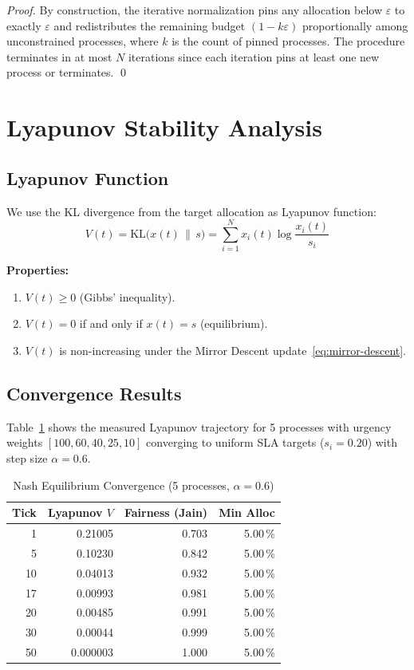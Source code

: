 \documentclass[sigconf]{acmart}
\begin{document}
\begin{proof}
By construction, the iterative normalization pins any allocation below
$\varepsilon$ to exactly $\varepsilon$ and redistributes the remaining
budget $(1 - k\varepsilon)$ proportionally among unconstrained processes,
where $k$ is the count of pinned processes.  The procedure terminates
in at most $N$ iterations since each iteration pins at least one new
process or terminates. \qed
\end{proof}

\section{Lyapunov Stability Analysis}
\label{sec:lyapunov}

\subsection{Lyapunov Function}

We use the KL divergence from the target allocation as Lyapunov function:
\[
  V(t) = \mathrm{KL}\bigl(x(t) \,\|\, s\bigr)
       = \sum_{i=1}^{N} x_i(t) \log \frac{x_i(t)}{s_i}
\]

\textbf{Properties:}
\begin{enumerate}
  \item $V(t) \geq 0$ (Gibbs' inequality).
  \item $V(t) = 0$ if and only if $x(t) = s$ (equilibrium).
  \item $V(t)$ is non-increasing under the Mirror Descent update~\eqref{eq:mirror-descent}.
\end{enumerate}

\subsection{Convergence Results}

Table~\ref{tab:nash} shows the measured Lyapunov trajectory for 5 processes
with urgency weights $[100, 60, 40, 25, 10]$ converging to uniform SLA
targets ($s_i = 0.20$) with step size $\alpha = 0.6$.

\begin{table}[h]
\centering
\caption{Nash Equilibrium Convergence (5 processes, $\alpha=0.6$)}
\label{tab:nash}
\begin{tabular}{@{}rrrr@{}}
\toprule
Tick & Lyapunov $V$ & Fairness (Jain) & Min Alloc \\
\midrule
  1  & 0.21005  & 0.703  & 5.00\,\% \\
  5  & 0.10230  & 0.842  & 5.00\,\% \\
 10  & 0.04013  & 0.932  & 5.00\,\% \\
 17  & 0.00993  & 0.981  & 5.00\,\% \\
 20  & 0.00485  & 0.991  & 5.00\,\% \\
 30  & 0.00044  & 0.999  & 5.00\,\% \\
 50  & 0.000003 & 1.000  & 5.00\,\% \\
\bottomrule
\end{tabular}
\end{table}
\end{document}
